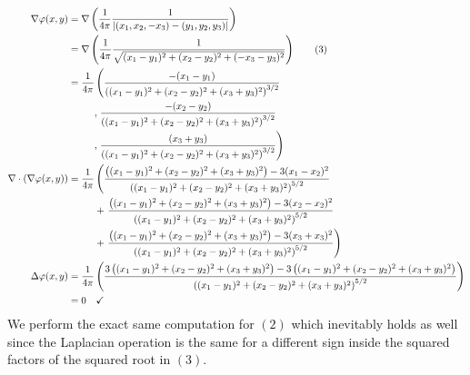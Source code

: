 \documentclass[12pt]{article}
\theoremstyle{definition}
\theoremstyle{definition}
\theoremstyle{definition}
\theoremstyle{definition}
\theoremstyle{definition}
\theoremstyle{example}
\theoremstyle{note}
\theoremstyle{remark}
\theoremstyle{example}
\begin{document}
			\begin{align*}
				\nabla \varphi(x,y) &= \nabla \left(\frac{1}{4\pi} \frac{1}{\abs{(x_{1},x_{2},-x_{3}) - (y_{1},y_{2},y_{3})}}\right) \\
				&= \nabla \left(\frac{1}{4\pi}\frac{1}{\sqrt{(x_{1} -y_{1})^{2} + (x_{2} - y_{2})^{2} +(-x_{3} -y_{3})^{2}}}\right) \tag{3} \\
				&= \frac{1}{4\pi}
				\begin{aligned}[t]
					&\left( \frac{-(x_{1} - y_{1})}{\left((x_{1} - y_{1})^{2} +(x_{2}-y_{2})^{2} + (x_{3}+y_{3})^{2}\right)^{3/2}} \right. \\
					&,\left.  \frac{-(x_{2} - y_{2})}{\left((x_{1} - y_{1})^{2} +(x_{2}-y_{2})^{2} + (x_{3}+y_{3})^{2}\right)^{3/2}} \right.\\
					&, \left.  \frac{(x_{3} + y_{3})}{\left((x_{1} - y_{1})^{2} +(x_{2}-y_{2})^{2} + (x_{3}+y_{3})^{2}\right)^{3/2}} \right)
				\end{aligned} \\
				\nabla \cdot (\nabla \varphi(x,y)) &= \frac{1}{4\pi} 
				\begin{aligned}[t]
					&\left( \frac{\left((x_{1} - y_{1})^{2} +(x_{2}-y_{2})^{2} + (x_{3}+y_{3})^{2}\right) - 3(x_{1} - x_{2})^{2}}{\left((x_{1} - y_{1})^{2} +(x_{2}-y_{2})^{2} + (x_{3}+y_{3})^{2}\right)^{5/2}} \right. \\
					&+ \left. \frac{\left((x_{1} - y_{1})^{2} +(x_{2}-y_{2})^{2} + (x_{3}+y_{3})^{2}\right) - 3(x_{2} - x_{2})^{2}}{\left((x_{1} - y_{1})^{2} +(x_{2}-y_{2})^{2} + (x_{3}+y_{3})^{2}\right)^{5/2}} \right. \\
					&+\left. \frac{\left((x_{1} - y_{1})^{2} +(x_{2}-y_{2})^{2} + (x_{3}+y_{3})^{2}\right) - 3(x_{3} + x_{3})^{2}}{\left((x_{1} - y_{1})^{2} +(x_{2}-y_{2})^{2} + (x_{3}+y_{3})^{2}\right)^{5/2}} \right) \\
				\end{aligned}\\
				\Delta \varphi(x,y) &= \frac{1}{4\pi} \left(\frac{3\left((x_{1} - y_{1})^{2} +(x_{2}-y_{2})^{2} + (x_{3}+y_{3})^{2}\right) - 3\left((x_{1} - y_{1})^{2} +(x_{2}-y_{2})^{2} + (x_{3}+y_{3})^{2}\right)}{\left((x_{1} - y_{1})^{2} +(x_{2}-y_{2})^{2} + (x_{3}+y_{3})^{2}\right)^{5/2}}\right)\\
				&= 0 \quad \checkmark
			\end{align*}
			We perform the exact same computation for $(2)$ which inevitably holds as well since the Laplacian operation is the same for a different sign inside the squared factors of the squared root in $(3)$. \\
			
\end{document}
